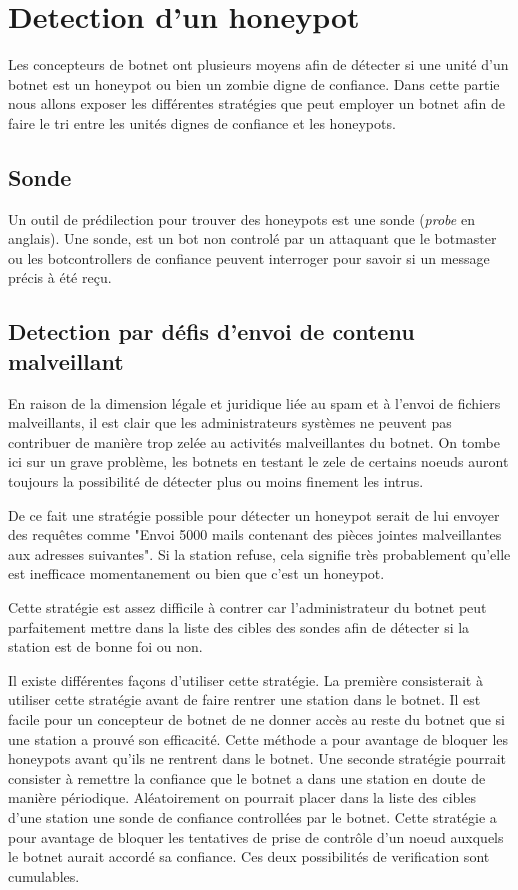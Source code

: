 \section{Detection d'un honeypot}

Les concepteurs de botnet ont plusieurs moyens afin de détecter si
une unité d'un botnet est un honeypot ou bien un zombie digne de confiance.
Dans cette partie nous allons exposer les différentes stratégies que peut employer
un botnet afin de faire le tri entre les unités dignes de confiance et les honeypots.

\subsection{Sonde}

Un outil de prédilection pour trouver des honeypots est une sonde (\textit{probe} en anglais).
Une sonde, est un bot non controlé par un attaquant que le botmaster ou les botcontrollers de confiance
peuvent interroger pour savoir si un message précis à été reçu.

\subsection{Detection par défis d'envoi de contenu malveillant}

En raison de la dimension légale et juridique liée au spam et à l'envoi de fichiers malveillants,
il est clair que les administrateurs systèmes ne peuvent pas contribuer de manière trop zelée au
activités malveillantes du botnet. On tombe ici sur un grave problème, les botnets en testant le
zele de certains noeuds auront toujours la possibilité de détecter plus ou moins finement les intrus.

De ce fait une stratégie possible pour détecter un honeypot serait de lui envoyer des requêtes comme
"Envoi 5000 mails contenant des pièces jointes malveillantes aux adresses suivantes". Si la 
station refuse, cela signifie très probablement
qu'elle est inefficace momentanement ou bien que c'est un honeypot.

Cette stratégie est assez difficile à contrer car l'administrateur du botnet peut parfaitement mettre dans la
liste des cibles des sondes afin de détecter si la station est de bonne foi
ou non.

Il existe différentes façons d'utiliser cette stratégie.
La première consisterait à utiliser cette stratégie avant de faire rentrer une station dans le botnet.
Il est facile pour un concepteur de botnet de ne donner accès au reste du botnet que si une station
a prouvé son efficacité. Cette méthode a pour avantage de bloquer les honeypots avant qu'ils ne rentrent
dans le botnet.
Une seconde stratégie pourrait consister à remettre la confiance que le botnet a dans une station en doute
de manière périodique. Aléatoirement on pourrait placer dans la liste des cibles d'une station une sonde
de confiance controllées par le botnet. Cette stratégie a pour avantage de bloquer les tentatives de prise
de contrôle d'un noeud auxquels le botnet aurait accordé sa confiance.
Ces deux possibilités de verification sont cumulables.

